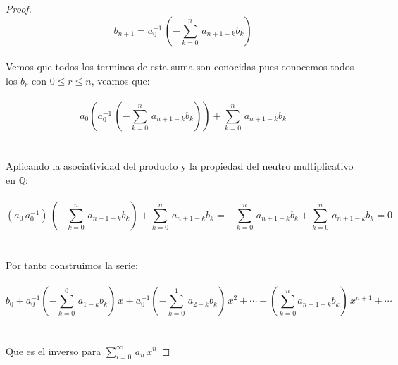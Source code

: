 \documentclass[11pt,letterpaper]{article}
\newcommand{\Q}{\mathbb{Q}}
\begin{document}
\begin{proof}
    \,\\
    \begin{equation*}
        b_{n+1}=a_0^{-1}\,\left(-\sum_{k=0}^{n}\,a_{n+1-k}b_k\right)
    \end{equation*}\,\\
    Vemos que todos los terminos de esta suma son conocidas pues conocemos todos los $b_r$ con $0\leq r\leq n$, veamos que:\,\\
    \,\\
    \begin{equation*}
        a_0\left(a_0^{-1}\,\left(-\sum_{k=0}^{n}\,a_{n+1-k}b_k\right)\right)+\sum_{k=0}^{n}\,a_{n+1-k}b_k
    \end{equation*}\,\\
    \,\\
    Aplicando la asociatividad del producto y la propiedad del neutro multiplicativo  en $\Q$:\,\\
    \,\\
    \begin{equation*}
        (a_0\,a_0^{-1})\,\left(-\sum_{k=0}^{n}\,a_{n+1-k}b_k\right)+\sum_{k=0}^{n}\,a_{n+1-k}b_k=-\sum_{k=0}^{n}\,a_{n+1-k}b_k+\sum_{k=0}^{n}\,a_{n+1-k}b_k=0
    \end{equation*}\,\\
    \,\\
    Por tanto construimos la serie:\,\\
    \,\\
    \begin{equation*}
        b_0+a_0^{-1}\left(-\sum_{k=0}^{0}\,a_{1-k}b_k\right)\,x+a_0^{-1}\left(-\sum_{k=0}^{1}\,a_{2-k}b_k\right)\,x^2+\cdots+\left(\sum_{k=0}^n a_{n+1-k}b_{k}\right)\,x^{n+1}+\cdots
    \end{equation*}\,\\
    \,\\
    Que es el inverso para $\displaystyle\sum_{i=0}^{\infty}\,a_n\,x^n$
    
\end{proof}
\end{document}
